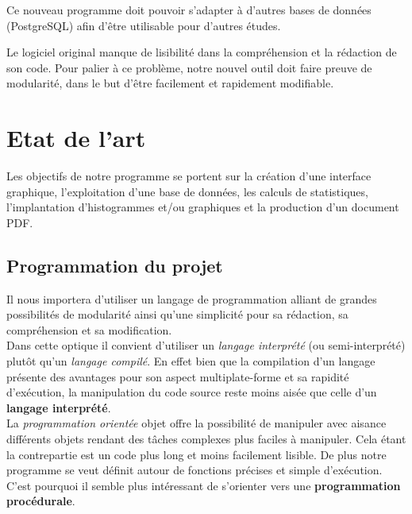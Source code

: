 \documentclass[a4paper]{report}
\begin{document}
Ce nouveau programme doit pouvoir s'adapter à d'autres bases de données (PostgreSQL) afin d'être utilisable pour d'autres études.

Le logiciel original manque de lisibilité dans la compréhension et la rédaction de son code. Pour palier à ce problème, notre nouvel outil doit faire preuve de modularité, dans le but d'être facilement et rapidement modifiable.


\section{Etat de l'art}



Les objectifs de notre programme se portent sur la création d'une interface graphique, l'exploitation d'une base de données, les calculs de statistiques, l'implantation d'histogrammes et/ou graphiques et la production d'un document PDF.\\


\subsection*{Programmation du projet}

Il nous importera d'utiliser un langage de programmation alliant de grandes possibilités de modularité ainsi qu'une simplicité pour sa rédaction, sa compréhension et sa modification.\\

Dans cette optique il convient d'utiliser un \textit{langage interprété} (ou semi-interprété) plutôt qu'un \textit{langage compilé}. En effet bien que la compilation d'un langage présente des avantages pour son aspect multiplate-forme et sa rapidité d'exécution, la manipulation du code source reste moins aisée que celle d'un \textbf{langage interprété}.\\

La \textit{programmation orientée} objet offre la possibilité de manipuler avec aisance différents objets rendant des tâches complexes plus faciles à manipuler. Cela étant la contrepartie est un code plus long et moins facilement lisible. De plus notre programme se veut définit autour de fonctions précises et simple d'exécution. C'est pourquoi il semble plus intéressant de s'orienter vers une \textbf{programmation procédurale}.\\
\end{document}
